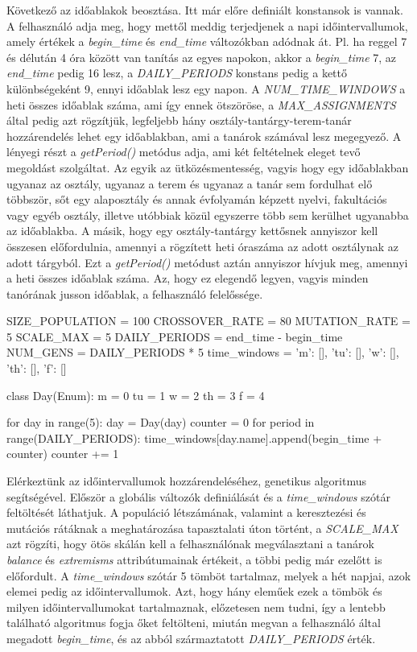 Következő az időablakok beosztása. Itt már előre definiált konstansok is vannak. A felhasználó adja meg, hogy mettől meddig terjedjenek a napi időintervallumok, amely értékek a \textit{begin\_time} és \textit{end\_time} változókban adódnak át. Pl. ha reggel 7 és délután 4 óra között van tanítás az egyes napokon, akkor a \textit{begin\_time} 7, az \textit{end\_time} pedig 16 lesz, a \textit{DAILY\_PERIODS} konstans pedig a kettő különbségeként 9, ennyi időablak lesz egy napon. A \textit{NUM\_TIME\_WINDOWS} a heti összes időablak száma, ami így ennek ötszöröse, a \textit{MAX\_ASSIGNMENTS} által pedig azt rögzítjük, legfeljebb hány osztály-tantárgy-terem-tanár hozzárendelés lehet egy időablakban, ami a tanárok számával lesz megegyező. A lényegi részt a \textit{getPeriod()} metódus adja, ami két feltételnek eleget tevő megoldást szolgáltat. Az egyik az ütközésmentesség, vagyis hogy egy időablakban ugyanaz az osztály, ugyanaz a terem és ugyanaz a tanár sem fordulhat elő többször, sőt egy alaposztály és annak évfolyamán képzett nyelvi, fakultációs vagy egyéb osztály, illetve utóbbiak közül egyszerre több sem kerülhet ugyanabba az időablakba. A másik, hogy egy osztály-tantárgy kettősnek annyiszor kell összesen előfordulnia, amennyi a rögzített heti óraszáma az adott osztálynak az adott tárgyból. Ezt a \textit{getPeriod()} metódust aztán annyiszor hívjuk meg, amennyi a heti összes időablak száma. Az, hogy ez elegendő legyen, vagyis minden tanórának jusson időablak, a felhasználó felelőssége.


\begin{python}
	SIZE_POPULATION = 100
	CROSSOVER_RATE = 80
	MUTATION_RATE = 5
	SCALE_MAX = 5
	DAILY_PERIODS = end_time - begin_time
	NUM_GENS = DAILY_PERIODS * 5
	time_windows = {'m': [], 'tu': [], 'w': [], 'th': [], 'f': []}
	
	
	class Day(Enum):
	m = 0
	tu = 1
	w = 2
	th = 3
	f = 4
	
	
	for day in range(5):
	day = Day(day)
	counter = 0
	for period in range(DAILY_PERIODS):
	time_windows[day.name].append(begin_time + counter)
	counter += 1
\end{python}

Elérkeztünk az időintervallumok hozzárendeléséhez, genetikus algoritmus segítségével. Először a globális változók definiálását és a \textit{time\_windows} szótár feltöltését láthatjuk. A populáció létszámának, valamint a keresztezési és mutációs rátáknak a meghatározása tapasztalati úton történt, a \textit{SCALE\_MAX} azt rögzíti, hogy ötös skálán kell a felhasználónak megválasztani a tanárok \textit{balance} és \textit{extremisms} attribútumainak értékeit, a többi pedig már ezelőtt is előfordult. A \textit{time\_windows} szótár 5 tömböt tartalmaz, melyek a hét napjai, azok elemei pedig az időintervallumok. Azt, hogy hány eleműek ezek a tömbök és milyen időintervallumokat tartalmaznak, előzetesen nem tudni, így a lentebb található algoritmus fogja őket feltölteni, miután megvan a felhasználó által megadott \textit{begin\_time}, és az abból származtatott \textit{DAILY\_PERIODS} érték.

